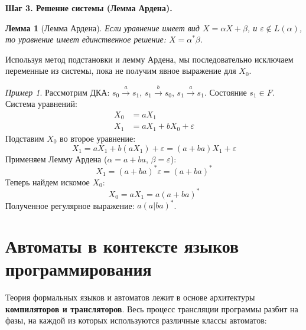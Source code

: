 \documentclass[12pt,a4paper]{article}
\theoremstyle{definition}
\theoremstyle{plain}
\newtheorem{lemma}{Лемма}
\theoremstyle{remark}
\newtheorem{example}{Пример}
\begin{document}
\textbf{Шаг 3. Решение системы (Лемма Ардена).}
\begin{lemma}[Лемма Ардена]
Если уравнение имеет вид $X = \alpha X + \beta$, и $\varepsilon \notin L(\alpha)$, то уравнение имеет единственное решение: $X = \alpha^* \beta$.
\end{lemma}

Используя метод подстановки и лемму Ардена, мы последовательно исключаем переменные из системы, пока не получим явное выражение для $X_0$.

\begin{example}
Рассмотрим ДКА: $s_0 \xrightarrow{a} s_1$, $s_1 \xrightarrow{b} s_0$, $s_1 \xrightarrow{a} s_1$. Состояние $s_1 \in F$.
Система уравнений:
\begin{align*}
    X_0 &= a X_1 \\
    X_1 &= a X_1 + b X_0 + \varepsilon
\end{align*}
Подставим $X_0$ во второе уравнение:
$$ X_1 = a X_1 + b (a X_1) + \varepsilon = (a + ba) X_1 + \varepsilon $$
Применяем Лемму Ардена ($\alpha = a+ba$, $\beta = \varepsilon$):
$$ X_1 = (a + ba)^* \varepsilon = (a + ba)^* $$
Теперь найдем искомое $X_0$:
$$ X_0 = a X_1 = a (a + ba)^* $$
Полученное регулярное выражение: $a(a|ba)^*$.
\end{example}

\section{Автоматы в контексте языков программирования}

Теория формальных языков и автоматов лежит в основе архитектуры \textbf{компиляторов и трансляторов}. Весь процесс трансляции программы разбит на фазы, на каждой из которых используются различные классы автоматов:
\end{document}
